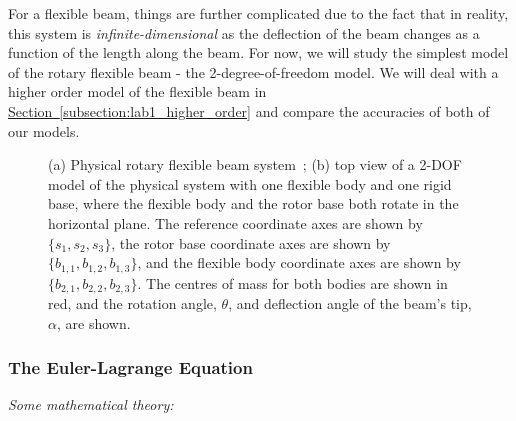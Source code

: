 \documentclass[12pt]{report}
\begin{document}
For a flexible beam, things are further complicated due to the fact that in reality, this system is \emph{infinite-dimensional} as the deflection of the beam changes as a function of the length along the beam. For now, we will study the simplest model of the rotary flexible beam - the 2-degree-of-freedom model. We will deal with a higher order model of the flexible beam in \hyperref[subsection:lab1_higher_order]{Section~\ref{subsection:lab1_higher_order}} and compare the accuracies of both of our models.
\begin{figure}[htb!]
    \centering
    \quad \quad \;
    \caption{(a) Physical rotary flexible beam system~\cite{Q-Flex-Beam}; (b) top view of a 2-DOF model of the physical system with one flexible body and one rigid base, where the flexible body and the rotor base both rotate in the horizontal plane. The reference coordinate axes are shown by $\{s_1,s_2,s_3\}$, the rotor base coordinate axes are shown by $\{b_{1,1},b_{1,2}, b_{1,3}\}$, and the flexible body coordinate axes are shown by $\{b_{2,1},b_{2,2},b_{2,3}\}$. The centres of mass for both bodies are shown in red, and the rotation angle, $\theta$, and deflection angle of the beam's tip, $\alpha$, are shown.}
    \label{fig:lab1_rotary_flexible_beam}
\end{figure}
\subsubsection{The Euler-Lagrange Equation}\label{subsubsection:lab1_EulerLagrange}
\emph{Some mathematical theory:}
\end{document}
